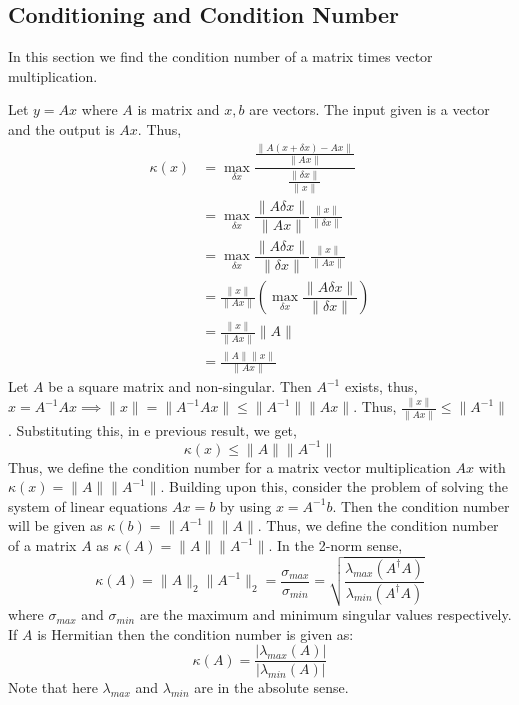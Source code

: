 \documentclass[12pt, oneside]{book}
\theoremstyle{definition}
\theoremstyle{definition}
\theoremstyle{remark}
\begin{document}
\subsection{Conditioning and Condition Number}In this section we find the condition number of a matrix times vector multiplication.

Let $y=Ax$ where $A$ is matrix and $x,b$ are vectors. The input given is a vector and the output is $Ax$. Thus,
\begin{align*}
\kappa(x) &= \max_{\delta x}\dfrac{\frac{\|A(x+\delta x) - Ax\|}{\|Ax\|}}{\frac{\|\delta x\|}{\|x\|}}\\
&=\max_{\delta x} \dfrac{\|A\delta x\|}{\|Ax\|}\frac{\|x\|}{\|\delta x\|}\\
&=\max_{\delta x} \dfrac{\|A\delta x\|}{\|\delta x\|}\frac{\|x\|}{\|Ax\|}\\
&=\frac{\|x\|}{\|Ax\|}\left(\max_{\delta x} \dfrac{\|A\delta x\|}{\|\delta x\|}\right)\\
&=\frac{\|x\|}{\|Ax\|}\|A\|\\
&=\frac{\|A\|\|x\|}{\|Ax\|}
\end{align*}
Let $A$ be a square matrix and non-singular. Then $A^{-1}$ exists, thus, $x=A^{-1}Ax \implies \|x\|=\|A^{-1}Ax\|\leq \|A^{-1}\|\|Ax\|$.
Thus, $\frac{\|x\|}{\|Ax\|}\leq \|A^{-1}\|$. Substituting this, in e previous result, we get,
\[
\kappa(x)\leq \|A\|\|A^{-1}\|
\]
Thus, we define the condition number for a matrix vector multiplication $Ax$ with $\kappa(x)=\|A\|\|A^{-1}\|$.
Building upon this, consider the problem of solving the system of linear equations $Ax=b$ by using $x=A^{-1}b$. Then the condition number will be given as $\kappa(b)=\|A^{-1}\|\|A\|$. Thus, we define the condition number of a matrix $A$ as $\kappa(A)=\|A\|\|A^{-1}\|$. In the 2-norm sense, 
\[
\kappa(A)=\|A\|_2\|A^{-1}\|_2=\dfrac{\sigma_{max}}{\sigma_{min}}=\sqrt{\dfrac{\lambda_{max}(A^{\dagger} A)}{\lambda_{min}(A^{\dagger}A)}}
\]
where $\sigma_{max}$ and $\sigma_{min}$ are the maximum and minimum singular values respectively. If $A$ is Hermitian then the condition number is given as:
\[
\kappa(A)=\dfrac{|\lambda_{max}(A)|}{|\lambda_{min}(A)|}
\]
Note that here $\lambda_{max}$ and $\lambda_{min}$ are in the absolute sense.
\end{document}

